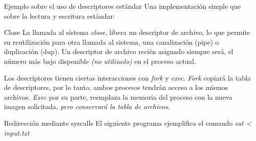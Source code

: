 \documentclass{libs/ufc_format}
\begin{document}
\begin{frame}{Ejemplo sobre el uso de descriptores estándar}
  Una implementación simple que sobre la lectura y escritura estándar:
  
\end{frame}
\begin{frame}{Close}
  La llamada al sistema \textit{close}, libera un descriptor de archivo, lo que permite su reutilización para otra llamada al sistema, una canalización (pipe) o duplicación (dup). Un descriptor de archivo recién asignado siempre será, el número más bajo disponible \emph{(no utilizado)} en el proceso actual.

  \vspace{0.3cm}

  Los descriptores tienen ciertas interacciones con \textit{fork} y \textit{exec}. \textit{Fork} copiará la tabla de descriptores, por lo tanto, ambos procesos tendrán acceso a los mismos archivos. \textit{Exec} por su parte, reemplaza la memoria del proceso con la nueva imagen solicitada, \emph{pero conservará la tabla de archivos}.

  \vspace{0.2cm}

\end{frame}
\begin{frame}{Redirección mediante syscalls}
  El siguiente programa ejemplifica el comando \textit{cat < input.txt}
  
\end{frame}
\end{document}
